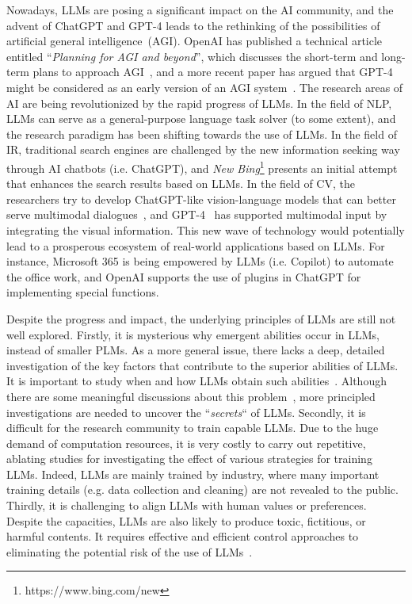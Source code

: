 Nowadays,  LLMs are posing a significant impact on the AI community, and the advent of ChatGPT and GPT-4 leads to the rethinking of the possibilities of artificial general intelligence~(AGI). OpenAI has published a technical article entitled ``\emph{Planning for AGI and beyond}'', which discusses the short-term and long-term plans to approach  AGI~\cite{OpenAI-blog-2023-Planning}, and a more recent paper has argued that GPT-4 might be considered as an early version of an AGI system~\cite{Bubeck-arxiv-2023-Sparks}. The research areas of AI are being revolutionized by the rapid progress of LLMs. In the field of NLP,  LLMs can serve as a general-purpose  language task solver (to some extent), and  the research paradigm has been shifting towards the use of LLMs. In the field of IR, traditional search engines are challenged by the new information seeking way through AI chatbots (i.e. ChatGPT), and  \emph{New Bing}\footnote{https://www.bing.com/new} presents an initial attempt that enhances  the search results based on LLMs. In the field of  CV, the researchers  try to develop ChatGPT-like vision-language models that can better serve multimodal dialogues~\cite{Huang-CoRR-2023,Cao-arxiv-2023-comprehensive, driess-arxiv-2023-palm,wu-arxiv-2023-visual}, and  GPT-4~\cite{OpenAI-OpenAI-2023-GPT-4} has  supported multimodal input by integrating the visual information. This new wave of technology would potentially lead to a prosperous ecosystem of real-world applications based on LLMs. For instance, Microsoft 365  is being empowered by  LLMs (i.e. Copilot) to automate the office work, and OpenAI supports the use of   plugins in ChatGPT for implementing special functions.  

Despite the  progress and impact,  the underlying principles of LLMs are still not well explored. Firstly, it is  mysterious   why emergent abilities occur in  LLMs,   instead of smaller PLMs. As a more general issue, there  lacks a deep, detailed investigation of the key factors that contribute to the superior abilities of LLMs. It is important to study when and how LLMs obtain such abilities~\cite{FU-blog-2022-how}. Although there are some meaningful discussions about this problem~\cite{Wei-arxiv-2022-Emergent,FU-blog-2022-how}, more principled investigations are needed to uncover the ``\emph{secrets}`` of LLMs. Secondly, it is difficult for the research community to train capable LLMs. Due to the huge demand of computation resources, it is very costly to carry out repetitive, ablating studies for investigating the effect of various strategies for training LLMs. Indeed,  LLMs are mainly trained by industry, where many important training details (e.g. data collection and cleaning) are not revealed to the public. Thirdly, it is  challenging to align LLMs with human values or preferences. Despite the capacities, LLMs are also likely to produce toxic, fictitious, or harmful contents. It requires effective and efficient control approaches  to  eliminating the potential risk of the use of LLMs~\cite{OpenAI-OpenAI-2023-GPT-4}.  

